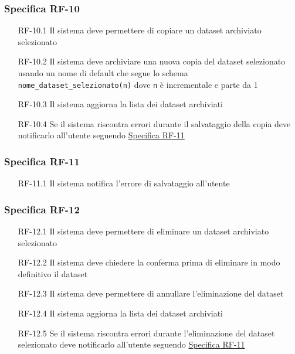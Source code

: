 \subsubsection{Specifica RF-10}
\label{subsubsec:RF-10}
\begin{enumerate}
    \item[RF-10.1] Il sistema deve permettere di copiare un dataset archiviato selezionato
    \item[RF-10.2] Il sistema deve archiviare una nuova copia del dataset selezionato usando un nome di default che segue lo schema \texttt{nome\_dataset\_selezionato(n)} dove \texttt{n} è incrementale e parte da 1
    \item[RF-10.3] Il sistema aggiorna la lista dei dataset archiviati
    \item[RF-10.4] Se il sistema riscontra errori durante il salvataggio della copia deve notificarlo all'utente seguendo \hyperref[subsubsec:RF-11]{Specifica RF-11}
\end{enumerate}

\subsubsection{Specifica RF-11}
\label{subsubsec:RF-11}
\begin{enumerate}
    \item[RF-11.1] Il sistema notifica l'errore di salvataggio all'utente
\end{enumerate}

\subsubsection{Specifica RF-12}
\label{subsubsec:RF-12}
\begin{enumerate}
    \item[RF-12.1] Il sistema deve permettere di eliminare un dataset archiviato selezionato
    \item[RF-12.2] Il sistema deve chiedere la conferma prima di eliminare in modo definitivo il dataset
    \item[RF-12.3] Il sistema deve permettere di annullare l'eliminazione del dataset
    \item[RF-12.4] Il sistema aggiorna la lista dei dataset archiviati
    \item[RF-12.5] Se il sistema riscontra errori durante l'eliminazione del dataset selezionato deve notificarlo all'utente seguendo \hyperref[subsubsec:RF-11]{Specifica RF-11}
\end{enumerate}


